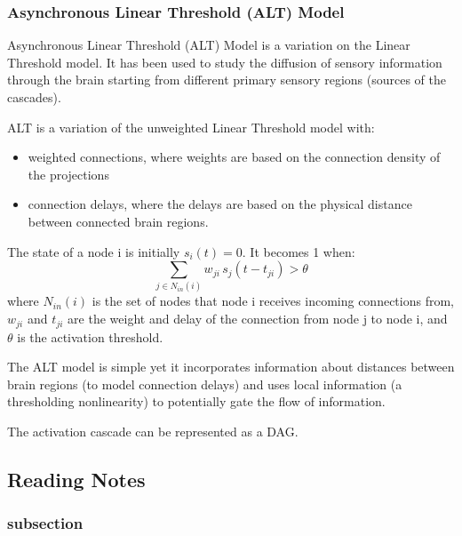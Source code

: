 \documentclass[11pt]{scrartcl} %
\begin{document}
\subsubsection{Asynchronous Linear Threshold (ALT) Model}
Asynchronous Linear Threshold (ALT) Model is a variation on the Linear Threshold model. It has been used to study the diffusion of sensory information through the brain starting from different primary sensory regions (sources of the cascades). 

ALT is a variation of the unweighted Linear Threshold model with:
\begin{itemize}
	\item weighted connections, where weights are based on the connection density of the projections
	\item connection delays, where the delays are based on the physical distance between connected brain regions.
\end{itemize}

The state of a node i is initially $s_i(t) = 0$. It becomes 1 when:
\[ \sum_{j \in N_{in}(i)} w_{ji}\, s_j(t- t_{ji}) > \theta \]
where $N_{in}(i)$ is the set of nodes that node i receives incoming connections from, $w_{ji}$ and $t_{ji}$ are the weight and delay of the connection from node j to node i, and $\theta$ is the activation threshold.

The ALT model is simple yet it incorporates information about distances between brain regions (to model connection delays) and uses local information (a thresholding nonlinearity) to potentially gate the flow of information.

The activation cascade can be represented as a DAG.




\subsection{Reading Notes}

\subsubsection{subsection}
\textbf{}

\end{document}
